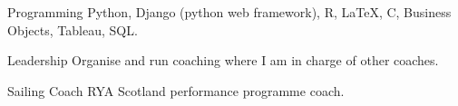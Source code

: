 

\begin{cvskills}

  \cvskill
    {Programming} %
    {Python, Django (python web framework), R, LaTeX, C, Business Objects, Tableau, SQL.} %

  \cvskill
    {Leadership} %
    {Organise and run coaching where I am in charge of other coaches.} %

  \cvskill
    {Sailing Coach} %
    {RYA Scotland performance programme coach.}


\end{cvskills}
